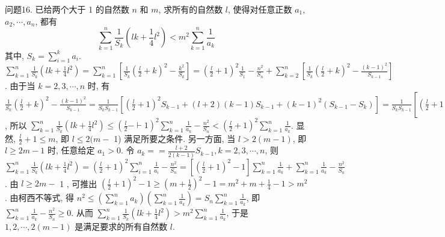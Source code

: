 问题16. 已给两个大于 1 的自然数 $n$ 和 $m$, 求所有的自然数 $l$, 使得对任意正数 $a_1$, $a_2, \cdots, a_n$, 都有
$$
\sum_{k=1}^n \frac{1}{S_k}\left(l k+\frac{1}{4} l^2\right)<m^2 \sum_{k=1}^n \frac{1}{a_k}
$$
其中, $S_k=\sum_{i=1}^k a_i$.
$\sum_{k=1}^n \frac{1}{S_k}\left(l k+\frac{1}{4} l^2\right)=\sum_{k=1}^n\left[\frac{1}{S_k}\left(\frac{l}{2}+k\right)^2-\frac{k^2}{S_k}\right]=\left(\frac{l}{2}+1\right)^2 \frac{1}{S_1}-\frac{n^2}{S_n}+ \sum_{k=2}^n\left[\frac{1}{S_k}\left(\frac{l}{2}+k\right)^2-\frac{(k-1)^2}{S_{k-1}}\right]$. 由于当 $k=2,3, \cdots, n$ 时, 有 $\frac{1}{S_k}\left(\frac{l}{2}+k\right)^2- \frac{(k-1)^2}{S_{k-1}}=\frac{1}{S_k S_{k-1}}\left[\left(\frac{l}{2}+1\right)^2 S_{k-1}+(l+2)(k-1) S_{k-1}+(k-1)^2\left(S_{k-1}-S_k\right)\right]= \frac{1}{S_k S_{k-1}}\left[\left(\frac{l}{2}+1\right)^2 S_{k-1}-\left(\sqrt{a_k}(k-1)-\left(\frac{l}{2}+1\right) \frac{S_{k-1}}{\sqrt{a_k}}\right)^2+\left(-\frac{l}{2}+1\right)^2 \frac{S_{k-1}^2}{a_k}\right] \leqslant \frac{1}{S_k S_{k-1}}\left(\frac{l}{2}+1\right)^2\left(S_{k-1}+\frac{S_{k-1}^2}{a_k}\right)=\left(\frac{l}{2}+1\right)^2 \frac{1}{a_k}$, 所以 $\sum_{k=1}^n \frac{1}{S_k}\left(l k+\frac{1}{4} l^2\right) \leqslant \left(\frac{l}{2}-\vdash 1\right)^2 \sum_{k=1}^n \frac{1}{a_k}-\frac{n^2}{S_n}<\left(\frac{l}{2}+1\right)^2 \sum_{k=1}^n \frac{1}{a_k}$. 显然, $\frac{l}{2}+1 \leqslant m$, 即 $l \leqslant 2(m-$ 1) 满足所要之条件.
另一方面, 当 $l>2(m-1)$, 即 $l \geqslant 2 m-1$ 时, 任意给定 $a_1>0$. 令 $a_k==\frac{l+2}{2(k-1)} S_{k-1}, k=2,3, \cdots, n$, 则 $\sum_{k=1}^n \frac{1}{S_k}\left(l k+\frac{1}{4} l^2\right)= \left(\frac{l}{2}+1\right)^2 \sum_{i=1}^n \frac{1}{a_i}-\frac{n^2}{S_n}=\left[\left(\frac{l}{2}+1\right)^2-1\right] \sum_{k=1}^n \frac{1}{a_k}+\sum_{k=1}^n \frac{1}{a_k}-\frac{n^2}{S_n}$. 由 $l \geqslant 2 m-$ 1 , 可推出 $\left(\frac{l}{2}+1\right)^2-1 \geqslant\left(m+\frac{1}{2}\right)^2-1=m^2+m+\frac{1}{4}-1>m^2$. 由柯西不等式, 得 $n^2 \leqslant\left(\sum_{k=1}^n a_k\right)\left(\sum_{k=1}^n \frac{1}{a_k}\right)=S_n \sum_{k=1}^n \frac{1}{a_k}$, 即 $\sum_{k=1}^n \frac{1}{a_k}-\frac{n^2}{S_n} \geqslant 0$. 从而 $\sum_{k=1}^n \frac{1}{S_k}\left(l k+\frac{1}{4} l^2\right)>m^2 \sum_{k=1}^n \frac{1}{a_k}$, 于是 $1,2, \cdots, 2(m-1)$ 是满足要求的所有自然数 $l$.



